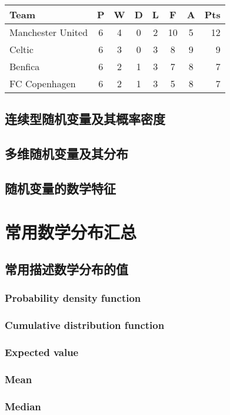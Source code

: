 \documentclass[11pt]{book}
\newcounter{#2}
\newcounter{#2}[#1]
\numberwithin{#2}{#1}
\begin{document}
	\begin{tabular}{l*{6}{c}r}
		Team              & P & W & D & L & F  & A & Pts \\
		\hline
		Manchester United & 6 & 4 & 0 & 2 & 10 & 5 & 12  \\
		Celtic            & 6 & 3 & 0 & 3 &  8 & 9 &  9  \\
		Benfica           & 6 & 2 & 1 & 3 &  7 & 8 &  7  \\
		FC Copenhagen     & 6 & 2 & 1 & 3 &  5 & 8 &  7  \\
	\end{tabular}
 





	\section{连续型随机变量及其概率密度}
	\section{多维随机变量及其分布}
	\section{随机变量的数学特征}
	
	\chapter{常用数学分布汇总}
		\section{常用描述数学分布的值}
			\subsection{Probability density function}
			\subsection{Cumulative distribution function}
			\subsection{Expected value}
			\subsection{Mean}
			\subsection{Median}
\end{document}
